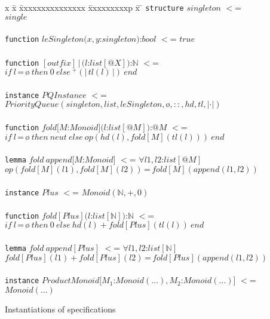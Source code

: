 \documentclass{article}
\theoremstyle{remark}
\theoremstyle{definition}
\newcommand{\iif}{\mathit{if}\ }
\newcommand{\ithen}{\mathit{then}\ }
\newcommand{\ielse}{\mathit{else}\ }
\newcommand{\iend}{\mathit{end}\ }
\newcommand{\itrue}{\mathit{true}\ }
\newcommand{\ieq}{\,\texttt{=}\,}
\newcommand{\nat}{\mathbb{N}}
\newcommand{\name}[1]{\mathit{#1}}
\begin{document}
\begin{figure}[t]
\begin{tabbing}
x \= x \= xxxxxxxxxxxxxxx \= xxxxxxxxxp \= x \= \kill
\texttt{structure} $\name{singleton}$ $<$= $\name{single}$ \\
\\
\texttt{function} $\name{leSingleton}(x,y$:$\name{singleton})$:$\name{bool}$ $<$= $\itrue$ \\
\\
\texttt{function} $[\name{outfix}]\,|\,(l$:$\name{list}[@X])$:$\nat$ $<$= $\iif l\ieq \mbox{\o}\  \ithen 0\ \ielse
^+(|\, \name{tl}(l)\, |)\ \iend$ \\
\\
\texttt{instance} $\name{PQInstance}$ $<$= $\name{PriorityQueue}(\name{singleton}, \name{list}, \name{leSingleton},
\mbox{\o}, \name{::}, \name{hd}, \name{tl}, |\cdot|)$ \\
\\
\texttt{function} $\name{fold}[M$:$\name{Monoid}](l$:$\name{list}[@M])$:$@M$ $<$= \\
$\iif l\ieq \mbox{\o}\ \ithen \name{neut}\ \ielse \name{op}(\name{hd}(l),\name{fold}[M](\name{tl}(l)))\ \iend$ \\
\\
\texttt{lemma} $\name{fold}\ \name{append}[M$:$\name{Monoid}]$ $<$= $\forall \name{l1},\name{l2}$:$\name{list}[@M]$ \\
\> $\name{op}(\name{fold}[M](\name{l1}),\name{fold}[M](\name{l2}))\ieq \name{fold}[M](\name{append}(\name{l1},\name{l2}))$ \\
\\
\texttt{instance} $\name{Plus}$ $<$= $\name{Monoid}(\nat,+,0)$ \\
\\
\texttt{function} $\name{fold}[\name{Plus}](l$:$\name{list}[\nat])$:$\nat$ $<$= \\
$\iif l\ieq \mbox{\o}\ \ithen 0\ \ielse \name{hd}(l) + \name{fold}[\name{Plus}](\name{tl}(l))\ \iend$ \\
\\
\texttt{lemma} $\name{fold}\ \name{append}[\name{Plus}]$ $<$= $\forall \name{l1},\name{l2}$:$\name{list}[\nat]$ \\
\> $\name{fold}[\name{Plus}](\name{l1}) + \name{fold}[\name{Plus}](\name{l2}) \ieq
\name{fold}[\name{Plus}](\name{append}(\name{l1},\name{l2})) $ \\
\\
\texttt{instance} $\name{ProductMonoid}[M_1$:$\name{Monoid}(\ldots),M_2$:$\name{Monoid}(\ldots)]$ $<$=
$\name{Monoid}(\ldots)$
\end{tabbing}

\caption{Instantiations of specifications} \label{fig:instances}
\end{figure}
\end{document}
